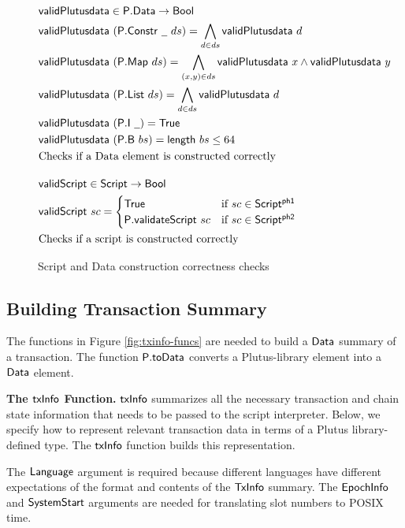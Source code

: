 \begin{figure*}[htb]
  \begin{align*}
    & \fun{validPlutusdata} \in \type{P.Data} \to \Bool \\
    & \fun{validPlutusdata}~ (\type{P.Constr} ~\wcard ~ds) = \bigwedge_{d\in ds} \type{validPlutusdata}~d \\
    & \fun{validPlutusdata}~ (\type{P.Map}~ ds) = \bigwedge_{(x,y)\in ds} \type{validPlutusdata}~x \wedge \type{validPlutusdata}~y \\
    & \fun{validPlutusdata} ~(\type{P.List}~ ds) =  \bigwedge_{d\in ds} \type{validPlutusdata}~d \\
    & \fun{validPlutusdata}~ (\type{P.I}~ \wcard) = \True \\
    & \fun{validPlutusdata}~ (\type{P.B}~ bs) = \fun{length} ~bs \leq 64 \\
    & \text{Checks if a Data element is constructed correctly}
    \nextdef
    & \fun{validScript} \in \Script \to \Bool \\
    & \fun{validScript} ~sc = \begin{cases}
      \True & \text{if $sc \in \ScriptPhOne$} \\
      \type{P.validateScript} ~sc & \text{if $sc \in \ScriptPhTwo$}
    \end{cases} \\
    & \text{Checks if a script is constructed correctly}
  \end{align*}
  \caption{Script and Data construction correctness checks}
  \label{fig:data-script-check}
\end{figure*}

\subsection{Building Transaction Summary}

The functions in Figure \ref{fig:txinfo-funcs} are needed to build a $\mathsf{Data}$ summary of a transaction.
The function $\mathsf{P.toData}$ converts a Plutus-library element
into a $\mathsf{Data}$ element.

\textbf{The $\mathsf{txInfo}$ Function.}
$\mathsf{txInfo}$ summarizes all the necessary transaction and chain state information
    that needs to be passed to the script interpreter. Below, we specify how to
    represent relevant transaction data in terms of a Plutus
    library-defined type. The $\mathsf{txInfo}$ function builds this representation.

    The $\mathsf{Language}$ argument
    is required because different languages have different expectations of the
    format and contents of the $\mathsf{TxInfo}$ summary. The $\mathsf{EpochInfo}$ and $\mathsf{SystemStart}$
    arguments are needed for translating slot numbers to POSIX time.

